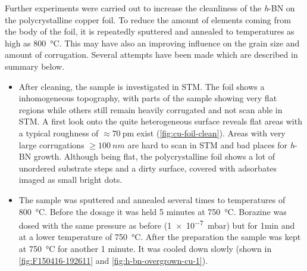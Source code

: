 Further experiments were carried out to increase the cleanliness of the \textit{h}-BN on the polycrystalline copper foil. To reduce the amount of elements coming from the body of the foil, it is repeatedly sputtered and annealed to temperatures as high as \SI{800}{\celsius}. This may have also an improving influence on the grain size and amount of corrugation. Several attempts have been made which are described in summary below.
\begin{itemize}
 \item After cleaning, the sample is investigated in STM. The foil shows a inhomogeneous topography, with parts of the sample showing very flat regions while others still remain heavily corrugated and not scan able in STM. 
 A first look onto the quite heterogeneous surface reveals flat areas with a typical roughness of $\approx \SI{70}{\pico\meter}$ exist (\autoref{fig:cu-foil-clean}). Areas with very large corrugations $\geq \SI{100}{nm}$ are hard to scan in STM and bad places for \textit{h}-BN growth. Although being flat, the polycrystalline foil shows a lot of unordered substrate steps and a dirty surface, covered with adsorbates imaged as small bright dots.
\end{itemize}
\begin{itemize}
	\item The sample was sputtered and annealed several times to temperatures of \SI{800}{\celsius}. Before the dosage it was held 5 minutes at \SI{750}{\celsius}. Borazine was dosed with the same pressure as before (\SI{1e-7}{\milli \bar}) but for 1min and at a lower temperature of \SI{750}{\celsius}. After the preparation the sample was kept at \SI{750}{\celsius} for another 1 minute. It was cooled down slowly (shown in \autoref{fig:F150416-192611} and \autoref{fig:h-bn-overgrown-cu-1}).
\end{itemize}
